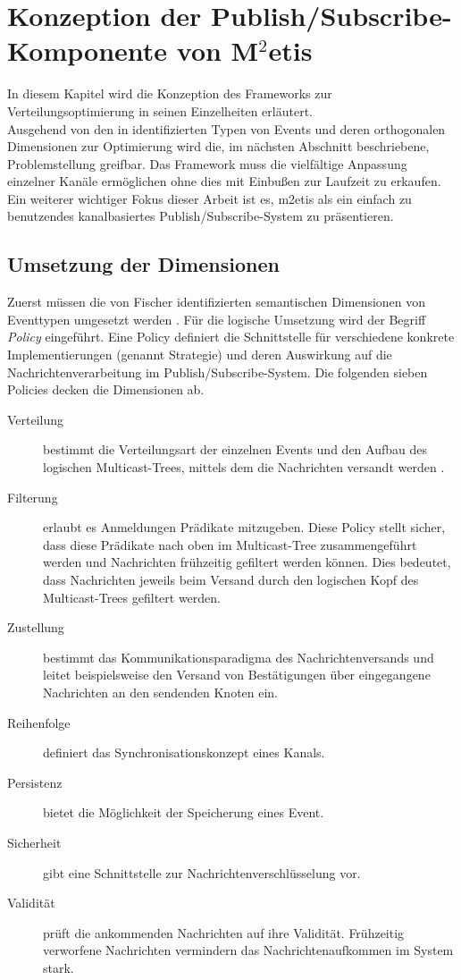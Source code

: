 \chapter[Konzeption der Publish/Subscribe-Komponente]{Konzeption der Publish/Subscribe-Komponente von M$^2$etis}
\label{chap:konzeption_pubsub}
In diesem Kapitel wird die Konzeption des Frameworks zur Verteilungsoptimierung in seinen Einzelheiten erläutert.\\
Ausgehend von den in \cite{Fischer2010a} identifizierten Typen von Events und deren orthogonalen Dimensionen zur Optimierung wird die, im nächsten Abschnitt beschriebene, Problemstellung greifbar. Das Framework muss die vielfältige Anpassung einzelner Kanäle ermöglichen ohne dies mit Einbußen zur Laufzeit zu erkaufen. Ein weiterer wichtiger Fokus dieser Arbeit ist es, \ac{m2etis} als ein einfach zu benutzendes kanalbasiertes Publish/Subscribe-System zu präsentieren.



\section{Umsetzung der Dimensionen}
Zuerst müssen die von Fischer identifizierten semantischen Dimensionen von Eventtypen umgesetzt werden \cite{Fischer2010Event}. Für die logische Umsetzung wird der Begriff \emph{Policy} eingeführt. Eine Policy definiert die Schnittstelle für verschiedene konkrete Implementierungen (genannt Strategie) und deren Auswirkung auf die Nachrichtenverarbeitung im Publish/Subscribe-System. Die folgenden sieben Policies decken die Dimensionen ab.

\begin{description}
\item[Verteilung] bestimmt die Verteilungsart der einzelnen Events und den Aufbau des logischen Multicast-Trees, mittels dem die Nachrichten versandt werden \cite{KostasKatrinis2005}.
\item[Filterung] erlaubt es Anmeldungen Prädikate mitzugeben. Diese Policy stellt sicher, dass diese Prädikate nach oben im Multicast-Tree zusammengeführt werden und Nachrichten frühzeitig gefiltert werden können. Dies bedeutet, dass Nachrichten jeweils beim Versand durch den logischen Kopf des Multicast-Trees gefiltert werden.
\item[Zustellung] bestimmt das Kommunikationsparadigma des Nachrichtenversands und leitet beispielsweise den Versand von Bestätigungen über eingegangene Nachrichten an den sendenden Knoten ein.
\item[Reihenfolge] definiert das Synchronisationskonzept eines Kanals.
\item[Persistenz] bietet die Möglichkeit der Speicherung eines Event.
\item[Sicherheit] gibt eine Schnittstelle zur Nachrichtenverschlüsselung vor.
\item[Validität] prüft die ankommenden Nachrichten auf ihre Validität. Frühzeitig verworfene Nachrichten vermindern das Nachrichtenaufkommen im System stark.
\end{description}

